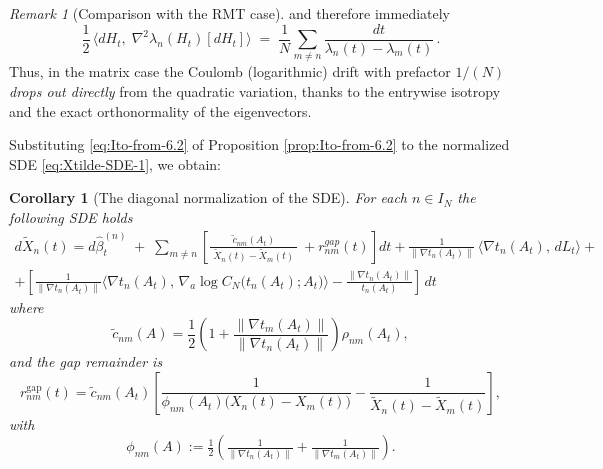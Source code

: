 \documentclass[12pt,reqno]{amsart}
\theoremstyle{plain}
\newtheorem{cor}[prop]{Corollary}
\theoremstyle{definition}
\theoremstyle{remark}
\newtheorem{rem}{Remark}[section]       %
\begin{document}
\begin{rem}[Comparison with the RMT case]
and therefore immediately
\begin{equation}
\frac{1}{2}\,\big\langle dH_t,\;\nabla^{2}\lambda_n(H_t)[dH_t]\big\rangle
 \;=\; \frac{1}{ N}\sum_{m\neq n}
 \frac{dt}{\lambda_n(t)-\lambda_m(t)}\,.
\end{equation}
Thus, in the matrix case the Coulomb (logarithmic) drift with prefactor
$1/(N)$ \emph{drops out directly} from the quadratic variation,
thanks to the entrywise isotropy and the exact orthonormality of the
eigenvectors.
\end{rem}

Substituting \eqref{eq:Ito-from-6.2} of Proposition \ref{prop:Ito-from-6.2} to the normalized SDE \eqref{eq:Xtilde-SDE-1}, we obtain:
\begin{cor}[The diagonal normalization of the SDE]\label{prop:Xtilde-SDE} For each $n\in I_N$ the following SDE holds 
\begin{multline}\label{eq:Xtilde-SDE}
d\widetilde X_n(t)
= d\hat\beta^{(n)}_t
\;+\; \sum_{m\neq n} \left[ \frac{\widetilde c_{nm}(A_t)}{\;\widetilde X_n(t)-\widetilde X_m(t)\;}\ +r_{nm}^{gap}(t) \right ]dt
+  \frac{1}{\big\|\nabla t_n(A_t) \big\|}\,\langle \nabla t_n(A_t) ,\,dL_t\rangle+\\+\left [\frac{1}{\|\nabla t_n(A_t)\|}\Big\langle \nabla t_n(A_t),\,\nabla_a \log C_N \!\bigl(t_n(A_t);A_t\bigr)\Big\rangle
-\frac{\|\nabla t_n(A_t)\|}{t_n(A_t)}\right ] \,dt
\end{multline}
where
\begin{equation}
\widetilde c_{nm}(A)=\frac{1}{2}\!\left(1+\frac{\big\|\nabla t_m(A_t) \big\|}{\big\|\nabla t_n(A_t) \big\|}\right)\rho_{nm}(A_t),
\end{equation}
and the gap remainder is
\begin{equation}
r^{\mathrm{gap}}_{nm}(t)
=\widetilde c_{nm}(A_t)\!
\left[\frac{1}{\phi_{nm}(A_t)\big(X_n(t)-X_m(t)\big)}-
\frac{1}{\widetilde X_n(t)-\widetilde X_m(t)}
\right],
\end{equation} 
with 
\begin{equation}
\phi_{nm}(A):=\tfrac12\!\left(\tfrac{1}{\big\|\nabla t_n(A_t) \big\|}+\tfrac{1}{\big\|\nabla t_m(A_t) \big\|}\right).
\end{equation}
\end{cor}
\end{document}

